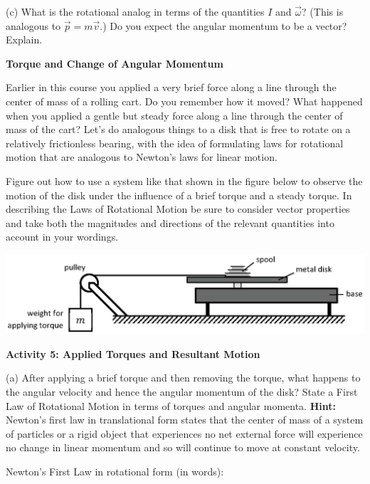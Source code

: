 (c) What is the rotational analog in terms of the quantities $I$ and \( 
\vec{\omega}  \)? (This is analogous to $\vec{p} = m\vec{v}$.)
Do you expect the angular momentum to be a vector? Explain.
\answerspace{30mm}

\textbf{Torque and Change of Angular Momentum }

Earlier in this course you applied a very brief force along a line through the
center of mass of a rolling cart. Do you remember how it moved? What happened
when you applied a gentle but steady force along a line through the center of
mass of the cart? Let's do analogous things to a disk that is free to rotate
on a relatively frictionless bearing, with the idea of formulating laws for
rotational motion that are analogous to Newton's laws for linear motion. 

Figure out how to use a system like that shown in the figure below to observe
the motion of the disk under the influence of a brief torque and a steady torque.
In describing the Laws of Rotational Motion be sure to consider vector properties
and take both the magnitudes and directions of the relevant quantities into
account in your wordings. 

\vspace{0.3cm}
{\par\centering \includegraphics{ang_mom/ang_mom_fig6_new.eps} \par}
\vspace{0.3cm}

\textbf{Activity 5: Applied Torques and Resultant Motion }

(a) After applying a brief torque and then removing the torque, what happens to the angular velocity and hence the angular momentum of the
disk? State a First Law of Rotational Motion in terms of torques and angular momenta. \textbf{Hint:} Newton's first law in translational form states that the center of mass of a system of particles or a rigid object that experiences no net external force will experience no change in linear momentum and so will continue to move at constant velocity.

Newton's First Law in rotational form (in words):
\vspace{20mm}

